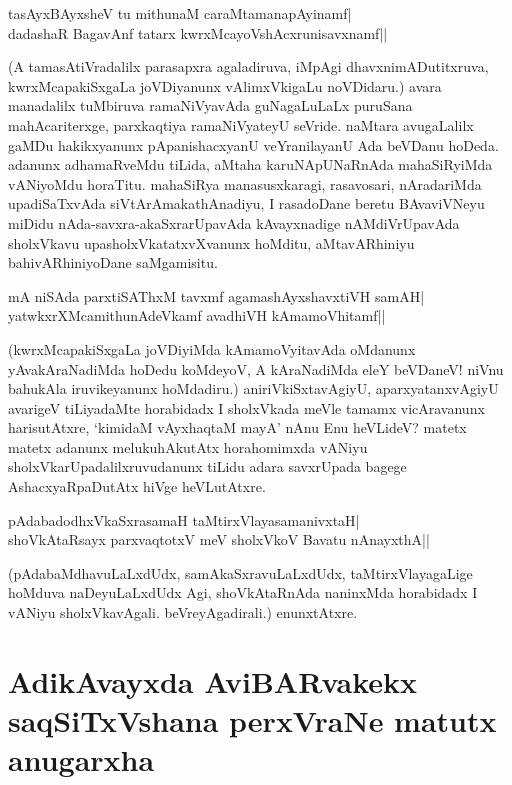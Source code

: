 \begin{shloka} 
tasAyxBAyxsheV tu mithunaM caraMtamanapAyinamf|\label{156a}\\ 
dadashaR BagavAnf tatarx kwrxMcayoVshAcxrunisavxnamf||
\end{shloka} 

(A tamasAtiVradalilx parasapxra agaladiruva, iMpAgi dhavxnimADutitxruva, kwrxMcapakiSxgaLa joVDiyanunx vAlimxVkigaLu noVDidaru.) avara manadalilx tuMbiruva ramaNiVyavAda guNagaLuLaLx puruSana mahAcariterxge, parxkaqtiya ramaNiVyateyU seVride. naMtara avugaLalilx gaMDu hakikxyanunx pApanishacxyanU veYranilayanU Ada beVDanu hoDeda. adanunx adhamaRveMdu tiLida, aMtaha karuNApUNaRnAda mahaSiRyiMda vANiyoMdu horaTitu. mahaSiRya manasusxkaragi, rasavosari, nAradariMda upadiSaTxvAda siVtArAmakathAnadiyu, I rasadoDane beretu BAvaviVNeyu miDidu nAda-savxra-akaSxrarUpavAda kAvayxnadige nAMdiVrUpavAda sholxVkavu upasholxVkatatxvXvanunx hoMditu, aMtavARhiniyu bahivARhiniyoDane saMgamisitu. 

\begin{shloka} 
mA niSAda parxtiSAThxM tavxmf agamashAyxshavxtiVH samAH|\label{157b}\\ 
yatwkxrXMcamithunAdeVkamf avadhiVH kAmamoVhitamf||
\end{shloka} 

(kwrxMcapakiSxgaLa joVDiyiMda kAmamoVyitavAda oMdanunx yAvakAraNadiMda hoDedu koMdeyoV, A kAraNadiMda eleY beVDaneV! niVnu bahukAla iruvikeyanunx hoMdadiru.) aniriVkiSxtavAgiyU, aparxyatanxvAgiyU avarigeV tiLiyadaMte horabidadx I sholxVkada meVle tamamx vicAravanunx harisutAtxre, `kimidaM vAyxhaqtaM mayA'\label{157} nAnu Enu heVLideV? matetx matetx adanunx melukuhAkutAtx horahomimxda vANiyu sholxVkarUpadalilxruvudanunx tiLidu adara savxrUpada bagege AshacxyaRpaDutAtx hiVge heVLutAtxre. 

\begin{shloka} 
pAdabadodhxV\s kaSxrasamaH taMtirxVlayasamanivxtaH|\label{157a}\\ 
shoVkAtaRsayx parxvaqtotxV meV sholxVkoV Bavatu nAnayxthA||
\end{shloka}

(pAdabaMdhavuLaLxdUdx, samAkaSxravuLaLxdUdx, taMtirxVlayagaLige hoMduva naDeyuLaLxdUdx Agi, shoVkAtaRnAda naninxMda horabidadx I vANiyu sholxVkavAgali. beVreyAgadirali.) enunxtAtxre. 

\section*{AdikAvayxda AviBARvakekx saqSiTxVshana perxVraNe matutx anugarxha} 

